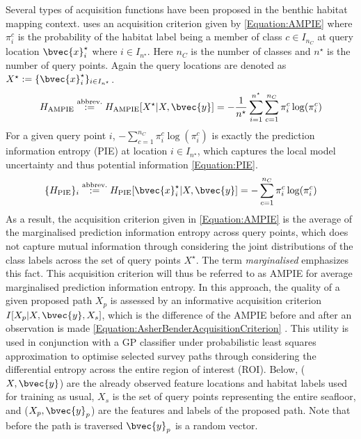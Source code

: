 			Several types of acquisition functions have been proposed in the benthic habitat mapping context. \cite{AsherBender} uses an acquisition criterion given by \eqref{Equation:AMPIE} where $\pi^{c}_{i}$ is the probability of the habitat label being a member of class $c \in I_{n_{C}}$ at query location $\bvec{x}^{\star}_{i}$ where $i \in I_{n^{\star}}$. Here $n_{C}$ is the number of classes and $n^{\star}$ is the number of query points. Again the query locations are denoted as $X^{\star} := \{\bvec{x}^{\star}_{i}\}_{i \in I_{n^{\star}}}$. \begin{equation}
				H_{\mathrm{AMPIE}} \stackrel{\text{abbrev.}}{:=} H_{\mathrm{AMPIE}}[X^{\star} | X, \bvec{y}] = - \frac{1}{n^{\star}} \sum_{i = 1}^{n^{\star}} \sum_{c = 1}^{n_{C}} \pi^{c}_{i} \log(\pi^{c}_{i})
			\label{Equation:AMPIE}
			\end{equation} For a given query point $i$, $- \sum_{c = 1}^{n_{C}} \pi^{c}_{i} \log(\pi^{c}_{i})$ is exactly the prediction information entropy (PIE) at location $i \in I_{n^{\star}}$, which captures the local model uncertainty and thus potential information \eqref{Equation:PIE}. \begin{equation}
				\{H_{\mathrm{PIE}}\}_{i} \stackrel{\text{abbrev.}}{:=} H_{\mathrm{PIE}}[\bvec{x}^{\star}_{i} | X, \bvec{y}] = - \sum_{c = 1}^{n_{C}} \pi^{c}_{i} \log(\pi^{c}_{i})
			\label{Equation:PIE}
			\end{equation} As a result, the acquisition criterion given in \eqref{Equation:AMPIE} is the average of the marginalised prediction information entropy across query points, which does not capture mutual information through considering the joint distributions of the class labels across the set of query points $X^{\star}$. The term \textit{marginalised} emphasizes this fact. This acquisition criterion will thus be referred to as AMPIE for average marginalised prediction information entropy. In this approach, the quality of a given proposed path $X_{p}$ is assessed by an informative acquisition criterion $I[X_{p} | X, \bvec{y}, X_{s}]$, which is the difference of the AMPIE before and after an observation is made \eqref{Equation:AsherBenderAcquisitionCriterion} \citep{Rigby:ROB20372}. This utility is used in conjunction with a GP classifier under probabilistic least squares approximation to optimise selected survey paths through considering the differential entropy across the entire region of interest (ROI). Below, ($X, \bvec{y}$) are the already observed feature locations and habitat labels used for training as usual, $X_{s}$ is the set of query points representing the entire seafloor, and ($X_{p}, \bvec{y}_{p}$) are the features and labels of the proposed path. Note that before the path is traversed $\bvec{y}_{p}$ is a random vector. \begin{equation}

\end{equation}
